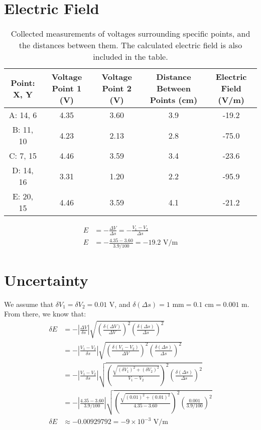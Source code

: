 \documentclass[12pt]{article}
\begin{document}
\section{Electric Field}

\begin{table}[H]
    \small
    \caption{Collected measurements of voltages surrounding specific points, and the distances between them.
            The calculated electric field is also included in the table.\\}
    \label{aggiungi}
    \hspace{-15mm} %
    \begin{tabular}{ccccc}
    \toprule
    Point: X, Y & Voltage Point 1 (V) & Voltage Point 2 (V) & Distance Between Points (cm) & Electric Field (V/m)\\
    \midrule
    A: 14, 6  & 4.35 & 3.60  & 3.9 & -19.2\\
    B: 11, 10 & 4.23 & 2.13 & 2.8 & -75.0\\
    C: 7, 15  & 4.46 & 3.59 & 3.4 & -23.6\\
    D: 14, 16 & 3.31 & 1.20  & 2.2 & -95.9\\
    E: 20, 15 & 4.46 & 3.59 & 4.1 & -21.2\\
    \bottomrule
    \end{tabular}
\end{table}

\begin{align*}
    E &= - \frac{\Delta V}{\Delta s} = - \frac{V_1 - V_2}{\Delta s} \\
    E &= - \frac{4.35 - 3.60}{3.9 / 100} = -19.2 \text{ V/m}
\end{align*}

\section{Uncertainty}
We assume that $\delta V_1 = \delta V_2 = 0.01$ V, and $\delta (\Delta s) = 1 \text{ mm} = 0.1 \text{ cm} = 0.001\text{ m}$.
From there, we know that:
\begin{align*}
    \delta E &= - \left |\frac{\Delta V}{\delta s}\right | \sqrt{\left(\frac{\delta(\Delta V)}{\Delta V}\right)^2 \left(\frac{\delta (\Delta s)}{\Delta s}\right)^2} \\
    &= - \left |\frac{V_1 - V_2}{\delta s}\right | \sqrt{\left(\frac{\delta(V_1 - V_2)}{\Delta V}\right)^2 \left(\frac{\delta (\Delta s)}{\Delta s}\right)^2} \\
    &= - \left |\frac{V_1 - V_2}{\delta s}\right | \sqrt{\left(\frac{\sqrt{(\delta V_1)^2 + (\delta V_2)^2}}{V_1 - V_2}\right)^2 \left(\frac{\delta (\Delta s)}{\Delta s}\right)^2} \\
    &= - \left |\frac{4.35 - 3.60}{3.9/100}\right | \sqrt{\left(\frac{\sqrt{(0.01)^2 + (0.01)^2}}{4.35 - 3.60}\right)^2 \left(\frac{0.001}{3.9/100}\right)^2} \\
    \delta E &\approx -0.00929792 = -9 \times 10^{-3} \text{ V/m}
\end{align*}
\end{document}
